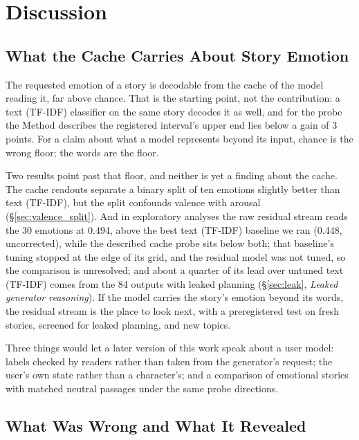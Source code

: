\section{Discussion}

\subsection{What the Cache Carries About Story Emotion}

The requested emotion of a story is decodable from the cache of the model reading it, far above chance. That is the starting point, not the contribution: a text (TF-IDF) classifier on the same story decodes it as well, and for the probe the Method describes the registered interval's upper end lies below a gain of 3 points. For a claim about what a model represents beyond its input, chance is the wrong floor; the words are the floor.

Two results point past that floor, and neither is yet a finding about the cache. The cache readouts separate a binary split of ten emotions slightly better than text (TF-IDF), but the split confounds valence with arousal (\S\ref{sec:valence_split}). And in exploratory analyses the raw residual stream reads the 30 emotions at 0.494, above the best text (TF-IDF) baseline we ran (0.448, uncorrected), while the described cache probe sits below both; that baseline's tuning stopped at the edge of its grid, and the residual model was not tuned, so the comparison is unresolved; and about a quarter of its lead over untuned text (TF-IDF) comes from the 84 outputs with leaked planning (\S\ref{sec:leak}, \emph{Leaked generator reasoning}). If the model carries the story's emotion beyond its words, the residual stream is the place to look next, with a preregistered test on fresh stories, screened for leaked planning, and new topics.

Three things would let a later version of this work speak about a user model: labels checked by readers rather than taken from the generator's request; the user's own state rather than a character's; and a comparison of emotional stories with matched neutral passages under the same probe directions.

\subsection{What Was Wrong and What It Revealed}

